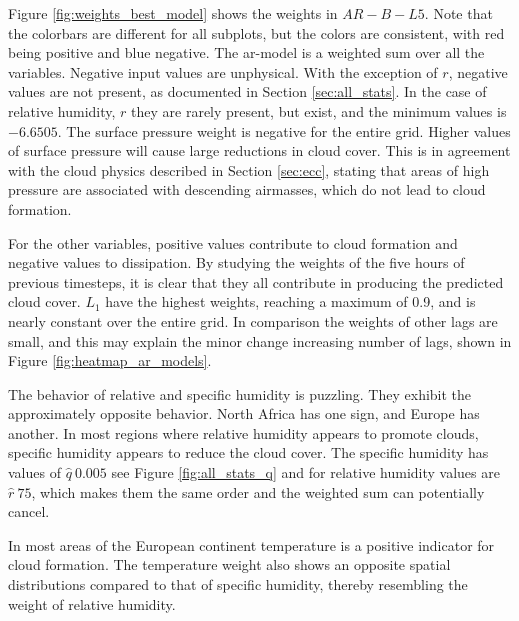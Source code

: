 Figure \ref{fig:weights_best_model} shows the weights in $AR-B-L5$. Note that the colorbars are different for all subplots, but the colors are consistent, with red being positive and blue negative. The \acrshort{ar}-model is a weighted sum over all the variables. Negative input values are unphysical. With the exception of $r$, negative values are not present, as documented in Section \ref{sec:all_stats}. In the case of relative humidity, $r$ they are rarely present, but exist, and the minimum values is $-6.6505$. 
The surface pressure weight is negative for the entire grid. Higher values of surface pressure will cause large reductions in cloud cover.
This is in agreement with the cloud physics described in Section \ref{sec:ecc}, stating that areas of high pressure are associated with descending airmasses, which do not lead to cloud formation.

For the other variables, positive values contribute to cloud formation and negative values to dissipation. By studying the weights of the five hours of previous timesteps, it is clear that they all contribute in producing the predicted cloud cover. $L_1$ have the highest weights, reaching a maximum of 0.9, and is nearly constant over the entire grid. 
In comparison the weights of other lags are small, and this may explain the minor change increasing number of lags, shown in Figure \ref{fig:heatmap_ar_models}. 

The behavior of relative and specific humidity is puzzling. They exhibit the approximately opposite behavior. North Africa has one sign, and Europe has another. In most regions where relative humidity appears to promote clouds, specific humidity appears to reduce the cloud cover. 
The specific humidity has values of $\hat{q}~0.005$ see Figure \ref{fig:all_stats_q} and for relative humidity values are $\hat{r}~75$, which makes them the same order and the weighted sum can potentially cancel. 

In most areas of the European continent temperature is a positive indicator for cloud formation. The temperature weight also shows an opposite spatial distributions compared to that of specific humidity, thereby resembling the weight of relative humidity. 

